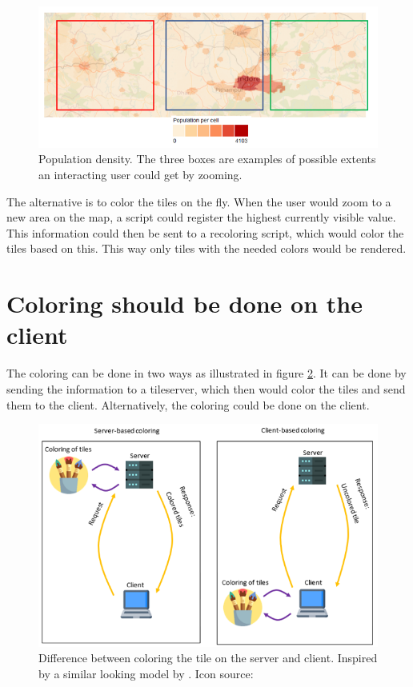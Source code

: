 \begin{figure} [H]
	\centering
	\includegraphics[width=.8\textwidth]{Pictures/WhyNotPrecolor}
	\caption{Population density. The three boxes are examples of possible extents an interacting user could get by zooming.}
	\label{WhyNotPrecolor}
\end{figure}

The alternative is to color the tiles on the fly. When the user would zoom to a new area on the map, a script could register the highest currently visible value. This information could then be sent to a recoloring script, which would color the tiles based on this. This way only tiles with the needed colors would be rendered. 


\section{Coloring should be done on the client}
The coloring can be done in two ways as illustrated in figure \ref{WhyColorLocally}. It can be done by sending the information to a tileserver, which then would color the tiles and send them to the client. Alternatively, the coloring could be done on the client. 

\begin{figure} [H]
	\centering
	\includegraphics[width=.8\textwidth]{Pictures/WhyColorLocally}
	\caption{Difference between coloring the tile on the server and client. Inspired by a similar looking model by \citet{Baumrocks}. Icon source: \citep{Freepik}}
	\label{WhyColorLocally}
\end{figure}


